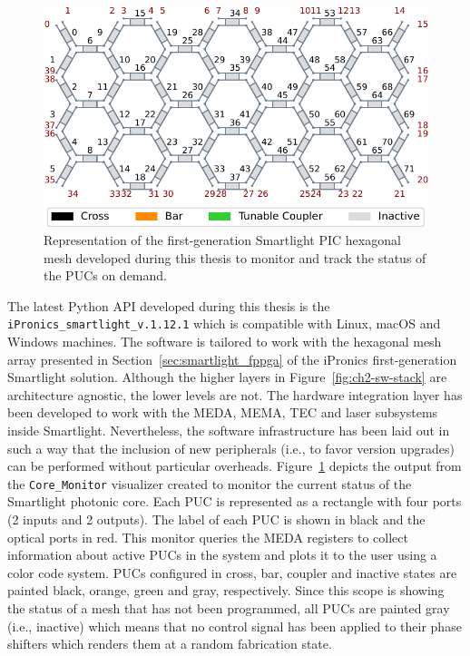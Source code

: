 \begin{figure}[h!]
	\begin{center}
		\includegraphics{figures/ch2-sw-mesh.pdf}
	\end{center}
	\caption{Representation of the first-generation Smartlight PIC hexagonal mesh developed during this thesis to monitor and track the status of the PUCs on demand.}\label{fig:ch2-sw-mesh}
\end{figure}

The latest Python API developed during this thesis is the \lstinline|iPronics_smartlight_v.1.12.1| which is compatible with Linux, macOS and Windows machines.
The software is tailored to work with the hexagonal mesh array presented in Section~\ref{sec:smartlight_fppga} of the iPronics first-generation Smartlight solution.
Although the higher layers in Figure~\ref{fig:ch2-sw-stack} are architecture agnostic, the lower levels are not.
The hardware integration layer has been developed to work with the MEDA, MEMA, TEC and laser subsystems inside Smartlight.
Nevertheless, the software infrastructure has been laid out in such a way that the inclusion of new peripherals (i.e., to favor version upgrades) can be performed without particular overheads.
Figure~\ref{fig:ch2-sw-mesh} depicts the output from the \lstinline|Core_Monitor| visualizer created to monitor the current status of the Smartlight photonic core.
Each PUC is represented as a rectangle with four ports (2 inputs and 2 outputs).
The label of each PUC is shown in black and the optical ports in red.
This monitor queries the MEDA registers to collect information about active PUCs in the system and plots it to the user using a color code system.
PUCs configured in cross, bar, coupler and inactive states are painted black, orange, green and gray, respectively.
Since this scope is showing the status of a mesh that has not been programmed, all PUCs are painted gray (i.e., inactive) which means that no control signal has been applied to their phase shifters which renders them at a random fabrication state.

